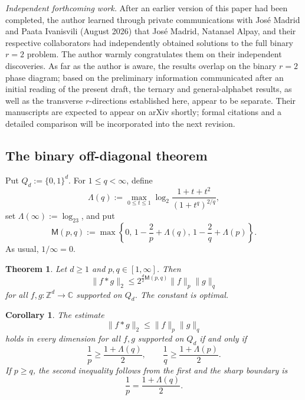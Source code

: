 \documentclass[11pt,reqno]{amsart}
\numberwithin{equation}{section}
\newtheorem{theorem}{Theorem}[section]
\newtheorem{corollary}[corollary]{Corollary}
\theoremstyle{definition}
\theoremstyle{remark}
\newcommand{\Z}{\mathbb Z}
\newcommand{\C}{\mathbb C}
\newcommand{\Lambdaq}{\Lambda}
\newcommand{\Mu}{\mathsf M}
\newcommand{\logtwo}{\log_2}
\begin{document}
\par\medskip
\indent\textit{Independent forthcoming work.}\enspace
After an earlier version of this paper had been completed, the author learned through private communications with Jos\'e Madrid and Paata Ivanisvili (August 2026) that Jos\'e Madrid, Natanael Alpay, and their respective collaborators had independently obtained solutions to the full binary $r=2$ problem.  The author warmly congratulates them on their independent discoveries.  As far as the author is aware, the results overlap on the binary $r=2$ phase diagram; based on the preliminary information communicated after an initial reading of the present draft, the ternary and general-alphabet results, as well as the transverse $r$-directions established here, appear to be separate.  Their manuscripts are expected to appear on arXiv shortly; formal citations and a detailed comparison will be incorporated into the next revision.

\subsection{The binary off-diagonal theorem}
Put $Q_d:=\{0,1\}^d$.  For $1\le q<\infty$, define
\begin{equation}\label{eq:Lambda-def-intro}
  \Lambdaq(q)
  :=\max_{0\le t\le1}
  \logtwo\frac{1+t+t^2}{(1+t^q)^{2/q}},
\end{equation}
set $\Lambdaq(\infty):=\logtwo3$, and put
\begin{equation}\label{eq:M-def-intro}
  \Mu(p,q)
  :=\max\left\{
    0,\,
    1-\frac2p+\Lambdaq(q),\,
    1-\frac2q+\Lambdaq(p)
  \right\}.
\end{equation}
As usual, $1/\infty=0$.

\begin{theorem}\label{thm:main}
Let $d\ge1$ and $p,q\in[1,\infty]$.  Then
\begin{equation}\label{eq:main-sharp}
  \|f*g\|_2
  \le 2^{\frac d2\Mu(p,q)}\|f\|_p\|g\|_q
\end{equation}
for all $f,g\colon\Z^d\to\C$ supported on $Q_d$.  The constant is optimal.
\end{theorem}

\begin{corollary}\label{cor:phase-region}
The estimate
\begin{equation}\label{eq:constant-one}
  \|f*g\|_2\le\|f\|_p\|g\|_q
\end{equation}
holds in every dimension for all $f,g$ supported on $Q_d$ if and only if
\begin{equation}\label{eq:region-two-conditions}
  \frac1p\ge\frac{1+\Lambdaq(q)}2,
  \qquad
  \frac1q\ge\frac{1+\Lambdaq(p)}2.
\end{equation}
If $p\ge q$, the second inequality follows from the first and the sharp boundary is
\begin{equation}\label{eq:boundary-pq}
  \frac1p=\frac{1+\Lambdaq(q)}2.
\end{equation}
\end{corollary}
\end{document}
